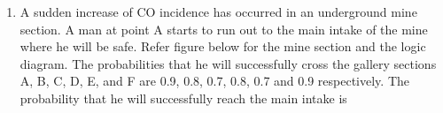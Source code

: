 \documentclass[journal]{IEEEtran}
\begin{document}
\begin{enumerate}
\hfill(GATE MN 2011)
\begin{multicols}{4}
\begin{enumerate}
  \item 4
  \item 8
  \item 12
  \item 16
\end{enumerate}
\end{multicols}


\item A sudden increase of CO incidence has occurred in an underground mine section. A man at point A starts to run out to the main intake of the mine where he will be safe. Refer figure below for the mine section and the logic diagram. The probabilities that he will successfully cross the gallery sections A, B, C, D, E, and F are 0.9, 0.8, 0.7, 0.8, 0.7 and 0.9 respectively. The probability that he will successfully reach the main intake is  

    
\begin{center}
\begin{minipage}{0.45\textwidth}


\end{minipage}
\end{center}
\end{enumerate}
\end{document}
